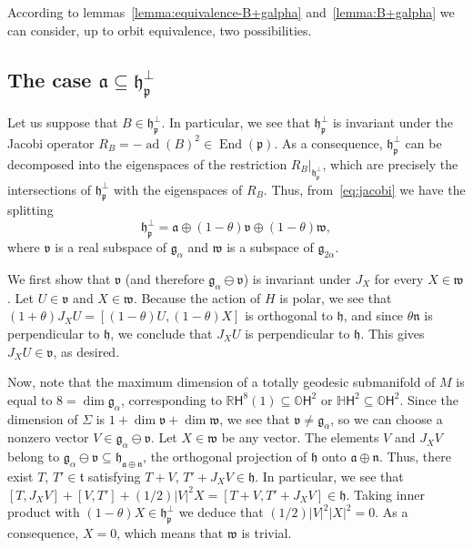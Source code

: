 \documentclass[12pt, a4paper]{amsart}
\newcommand{\g}{\mathfrak}
\newcommand{\s}{\mathsf}
\newcommand{\R}{\mathbb{R}}
\renewcommand{\H}{\mathbb{H}}
\renewcommand{\O}{\mathbb{O}}
\newcommand{\ad}{\operatorname{ad}}
\newcommand{\End}{\operatorname{End}}
\theoremstyle{definition}
\begin{document}
According to lemmas~\ref{lemma:equivalence-B+galpha} and~\ref{lemma:B+galpha} we can consider, up to orbit equivalence, two possibilities.

\subsection{The case $\g{a}\subseteq \g{h}_{\g{p}}^\perp$}\label{sec:a-in-spperp}\hfill

Let us suppose that $B\in\g{h}_{\g{p}}^\perp$.
In particular, we see that $\g{h}_{\g{p}}^\perp$ is invariant under the Jacobi operator $R_{B}=-\ad(B)^2\in\End(\g{p})$.
As a consequence, $\g{h}_{\g{p}}^\perp$ can be decomposed into the eigenspaces of the restriction $R_{B}\vert_{\g{h}_{\g{p}}^\perp}$, which are precisely the intersections of $\g{h}_{\g{p}}^\perp$ with the eigenspaces of $R_{B}$.
Thus, from~\eqref{eq:jacobi} we have the splitting
\begin{equation*}
	\g{h}_{\g{p}}^\perp=\g{a}\oplus(1-\theta)\g{v}\oplus(1-\theta)\g{w},
\end{equation*}
where $\g{v}$ is a real subspace of $\g{g}_\alpha$ and $\g{w}$ is a subspace of $\g{g}_{2\alpha}$.

We first show that $\g{v}$ (and therefore $\g{g}_{\alpha}\ominus\g{v}$) is invariant under $J_X$ for every $X\in\g{w}$.
Let $U\in\g{v}$ and $X\in\g{w}$.
Because the action of $H$ is polar, we see that $(1+\theta)J_X U=[(1-\theta)U,(1-\theta)X]$ is orthogonal to $\g{h}$, and since $\theta\g{n}$ is perpendicular to $\g{h}$, we conclude that $J_X U$ is perpendicular to $\g{h}$.
This gives $J_X U\in \g{v}$, as desired.

Now, note that the maximum dimension of a totally geodesic submanifold of $M$ is equal to $8= \dim \g{g}_\alpha$, 
corresponding to $\R\s{H}^8(1)\subseteq \O\s{H}^2$ or $\H\s{H}^2\subseteq\O\s{H}^2$.
Since the dimension of $\Sigma$ is $1+\dim \g{v}+\dim\g{w}$, we see that $\g{v}\neq \g{g}_\alpha$, so we can choose a nonzero vector $V\in\g{g}_\alpha\ominus\g{v}$.
Let $X\in\g{w}$ be any vector.
The elements $V$ and $J_X V$ belong to $\g{g}_\alpha\ominus \g{v}\subseteq \g{h}_{\g{a}\oplus\g{n}}$, the orthogonal projection of $\g{h}$ onto $\g{a}\oplus\g{n}$. 
Thus, there exist $T$, $T'\in\g{t}$ satisfying $T+V$, $T'+J_X V\in\g{h}$.
In particular, we see that $[T,J_X V]+[V,T']+(1/2)\lvert V \rvert^2 X=[T+V,T'+J_X V]\in\g{h}$.
Taking inner product with $(1-\theta)X\in\g{h}_{\g{p}}^\perp$ we deduce that $(1/2)\lvert V \rvert^2 \lvert X \rvert ^2 = 0$.
As a consequence, $X=0$, which means that $\g{w}$ is trivial.
\end{document}
